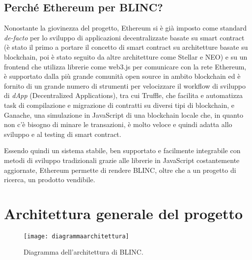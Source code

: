 \subsection{Perché Ethereum per BLINC?}
Nonostante la giovinezza del progetto, Ethereum si è già imposto come standard \emph{de-facto}
per lo sviluppo di applicazioni decentralizzate basate su smart contract
(è stato il primo a portare il concetto di smart contract su architetture
basate su blockchain, poi è stato seguito da altre architetture come Stellar e NEO)
e su un frontend che utilizza librerie come web3.js per comunicare con la rete Ethereum,
è supportato dalla più grande comunità open source in ambito blockchain ed è fornito di un grande numero
di strumenti per velocizzare il workflow di sviluppo di \emph{dApp} (Decentralized Applications), tra cui
Truffle, che facilita e automatizza task di compilazione e migrazione di contratti su diversi tipi di blockchain,
e Ganache, una simulazione in JavaScript di una blockchain locale che, in quanto non c'è bisogno di minare le
transazioni, è molto veloce e quindi adatta allo sviluppo e al testing di smart contract.

Essendo quindi un sistema stabile, ben supportato e facilmente integrabile con metodi di sviluppo tradizionali
grazie alle librerie in JavaScript costantemente aggiornate, Ethereum permette di rendere BLINC,
oltre che a un progetto di ricerca, un prodotto vendibile.

\section{Architettura generale del progetto}

\begin{figure}[!ht]
    \texttt{[image: diagrammaarchitettura]}
    \caption{Diagramma dell'architettura di BLINC.}
    \label{fig:diagrammaarchitettura}
\end{figure}

